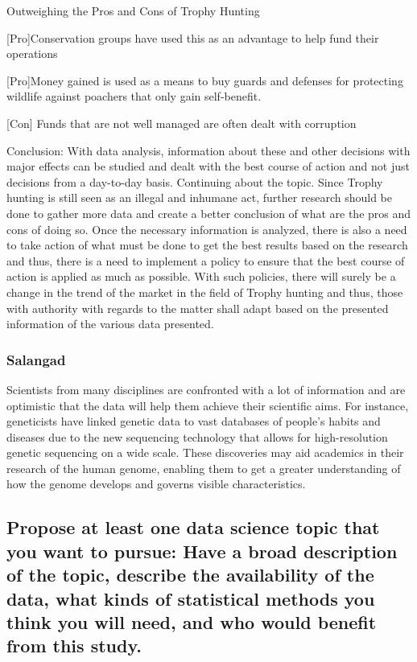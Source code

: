\documentclass[
]{article}
\begin{document}
Outweighing the Pros and Cons of Trophy Hunting

{[}Pro{]}Conservation groups have used this as an advantage to help fund
their operations

{[}Pro{]}Money gained is used as a means to buy guards and defenses for
protecting wildlife against poachers that only gain self-benefit.

{[}Con{]} Funds that are not well managed are often dealt with
corruption

Conclusion: With data analysis, information about these and other
decisions with major effects can be studied and dealt with the best
course of action and not just decisions from a day-to-day basis.
Continuing about the topic. Since Trophy hunting is still seen as an
illegal and inhumane act, further research should be done to gather more
data and create a better conclusion of what are the pros and cons of
doing so. Once the necessary information is analyzed, there is also a
need to take action of what must be done to get the best results based
on the research and thus, there is a need to implement a policy to
ensure that the best course of action is applied as much as possible.
With such policies, there will surely be a change in the trend of the
market in the field of Trophy hunting and thus, those with authority
with regards to the matter shall adapt based on the presented
information of the various data presented.

\hypertarget{salangad-1}{%
\subsubsection{Salangad}\label{salangad-1}}

Scientists from many disciplines are confronted with a lot of
information and are optimistic that the data will help them achieve
their scientific aims. For instance, geneticists have linked genetic
data to vast databases of people's habits and diseases due to the new
sequencing technology that allows for high-resolution genetic sequencing
on a wide scale. These discoveries may aid academics in their research
of the human genome, enabling them to get a greater understanding of how
the genome develops and governs visible characteristics.

\hypertarget{propose-at-least-one-data-science-topic-that-you-want-to-pursue-have-a-broad-description-of-the-topic-describe-the-availability-of-the-data-what-kinds-of-statistical-methods-you-think-you-will-need-and-who-would-benefit-from-this-study.}{%
\subsection{Propose at least one data science topic that you want to
pursue: Have a broad description of the topic, describe the availability
of the data, what kinds of statistical methods you think you will need,
and who would benefit from this
study.}\label{propose-at-least-one-data-science-topic-that-you-want-to-pursue-have-a-broad-description-of-the-topic-describe-the-availability-of-the-data-what-kinds-of-statistical-methods-you-think-you-will-need-and-who-would-benefit-from-this-study.}}
\end{document}
